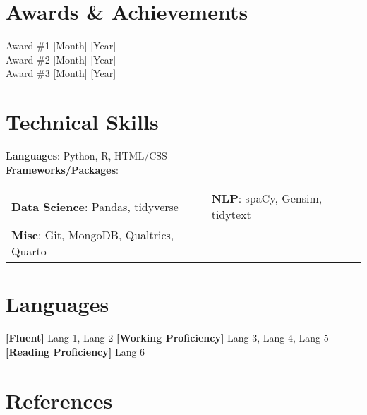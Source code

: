 \documentclass[letterpaper,11pt]{article}
\begin{document}

\section{Awards \& Achievements}

Award \#1 \hfill [Month] [Year]\vspace{1mm} \\
Award \#2 \hfill [Month] [Year]\vspace{1mm} \\
Award \#3 \hfill [Month] [Year]\vspace{1mm} \\


\section{Technical Skills}

\textbf{Languages}:
Python, R, HTML/CSS \vspace{2mm}\\

\textbf{Frameworks/Packages}:\vspace{1mm}
\setlength{}
\noindent\begin{tabularx}{\textwidth}{@{}bb@{}}
												\textbf{Data Science}: 				Pandas, 				tidyverse				&
				\textbf{NLP}: 				spaCy, 				Gensim, 				tidytext				\vspace{0.5mm}				\\
															\textbf{Misc}: 				Git, 				MongoDB, 				Qualtrics, 				Quarto				&
				\\
		\end{tabularx}


\section{Languages}

\textbf{[Fluent]} 
Lang 1, Lang 2 
\textbf{[Working Proficiency]} 
Lang 3, Lang 4, Lang 5 
\textbf{[Reading Proficiency]} 
Lang 6 

\clearpage

\section{References}
\end{document}

